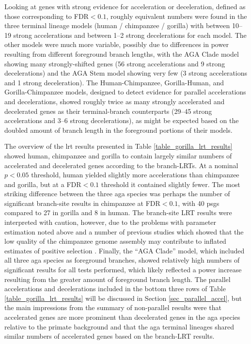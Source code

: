 Looking at genes with strong evidence for acceleration or
deceleration, defined as those corresponding to FDR$<0.1$, roughly
equivalent numbers were found in the three terminal lineage models
(human / chimpanzee / gorilla) with between 10--19 strong
accelerations and between 1--2 strong decelerations for each
model. The other models were much more variable, possibly due to
differences in power resulting from different foreground branch
lengths, with the AGA Clade model showing many strongly-shifted genes
(56 strong accelerations and 9 strong decelerations) and the AGA Stem
model showing very few (3 strong accelerations and 1 strong
deceleration). The Human-Chimpanzee, Gorilla-Human, and
Gorilla-Chimpanzee models, designed to detect evidence for parallel
accelerations and decelerations, showed roughly twice as many strongly
accelerated and decelerated genes as their terminal-branch
counterparts (29--45 strong accelerations and 3--6 strong
decelerations), as might be expected based on the doubled amount of
branch length in the foreground portions of their models.

The overview of the \ac{lrt} results presented in Table
\ref{table_gorilla_lrt_results} showed human, chimpanzee and gorilla
to contain largely similar numbers of accelerated and decelerated
genes according to the branch-LRTs. At a nominal $p<0.05$ threshold,
human yielded slightly more accelerations than chimpanzee and gorilla,
but at a FDR$<0.1$ threshold it contained slightly fewer. The most
striking difference between the three \ac{aga} species was perhaps the
number of significant branch-site results in chimpanzee at FDR$<0.1$,
with 40 \acp{psg} compared to 27 in gorilla and 8 in human. The
branch-site LRT results were interpreted with caution, however, due to
the problems with parameter estimation noted above and a number of
previous studies which showed that the low quality of the chimpanzee
genome assembly may contribute to inflated estimates of positive
selection \citep{Schneider2009,Mallick2009}. Finally, the ``AGA
Clade'' model, which included all three \ac{aga} species as foreground
branches, showed relatively high numbers of significant results for
all tests performed, which likely reflected a power increase resulting
from the greater amount of foreground branch length. The parallel
accelerations and decelerations included in the bottom three rows of
Table \ref{table_gorilla_lrt_results} will be discussed in Section
\ref{sec_parallel_accel}, but the main impressions from the summary of
non-parallel results were that accelerated genes are more prominent
than decelerated genes in the \ac{aga} species relative to the primate
background and that the \ac{aga} terminal lineages shared similar
numbers of accelerated genes based on the branch-LRT results.

